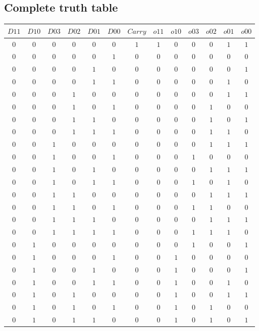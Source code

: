 \documentclass [15pt,a4paper,twoside]{article}
\begin{document}
\subsection{Complete truth table}
\begin{center}
\begin{tabular}{cccccc|ccccccc}
$D11$&$D10$&$D03$&$D02$&$D01$&$D00$&$Carry$&$o11$&$o10$&$o03$&$o02$&$o01$&$o00$\\
\hline
$0$&$0$&$0$&$0$&$0$&$0$&$1$&$1$&$0$&$0$&$0$&$1$&$1$\\
$0$&$0$&$0$&$0$&$0$&$1$&$0$&$0$&$0$&$0$&$0$&$0$&$0$\\
$0$&$0$&$0$&$0$&$1$&$0$&$0$&$0$&$0$&$0$&$0$&$0$&$1$\\
$0$&$0$&$0$&$0$&$1$&$1$&$0$&$0$&$0$&$0$&$0$&$1$&$0$\\
$0$&$0$&$0$&$1$&$0$&$0$&$0$&$0$&$0$&$0$&$0$&$1$&$1$\\
$0$&$0$&$0$&$1$&$0$&$1$&$0$&$0$&$0$&$0$&$1$&$0$&$0$\\
$0$&$0$&$0$&$1$&$1$&$0$&$0$&$0$&$0$&$0$&$1$&$0$&$1$\\
$0$&$0$&$0$&$1$&$1$&$1$&$0$&$0$&$0$&$0$&$1$&$1$&$0$\\
$0$&$0$&$1$&$0$&$0$&$0$&$0$&$0$&$0$&$0$&$1$&$1$&$1$\\
$0$&$0$&$1$&$0$&$0$&$1$&$0$&$0$&$0$&$1$&$0$&$0$&$0$\\
$0$&$0$&$1$&$0$&$1$&$0$&$0$&$0$&$0$&$0$&$1$&$1$&$1$\\
$0$&$0$&$1$&$0$&$1$&$1$&$0$&$0$&$0$&$1$&$0$&$1$&$0$\\
$0$&$0$&$1$&$1$&$0$&$0$&$0$&$0$&$0$&$0$&$1$&$1$&$1$\\
$0$&$0$&$1$&$1$&$0$&$1$&$0$&$0$&$0$&$1$&$1$&$0$&$0$\\
$0$&$0$&$1$&$1$&$1$&$0$&$0$&$0$&$0$&$0$&$1$&$1$&$1$\\
$0$&$0$&$1$&$1$&$1$&$1$&$0$&$0$&$0$&$1$&$1$&$1$&$0$\\
$0$&$1$&$0$&$0$&$0$&$0$&$0$&$0$&$0$&$1$&$0$&$0$&$1$\\
$0$&$1$&$0$&$0$&$0$&$1$&$0$&$0$&$1$&$0$&$0$&$0$&$0$\\
$0$&$1$&$0$&$0$&$1$&$0$&$0$&$0$&$1$&$0$&$0$&$0$&$1$\\
$0$&$1$&$0$&$0$&$1$&$1$&$0$&$0$&$1$&$0$&$0$&$1$&$0$\\
$0$&$1$&$0$&$1$&$0$&$0$&$0$&$0$&$1$&$0$&$0$&$1$&$1$\\
$0$&$1$&$0$&$1$&$0$&$1$&$0$&$0$&$1$&$0$&$1$&$0$&$0$\\
$0$&$1$&$0$&$1$&$1$&$0$&$0$&$0$&$1$&$0$&$1$&$0$&$1$\\

\end{tabular}
\end{center}
\end{document}
